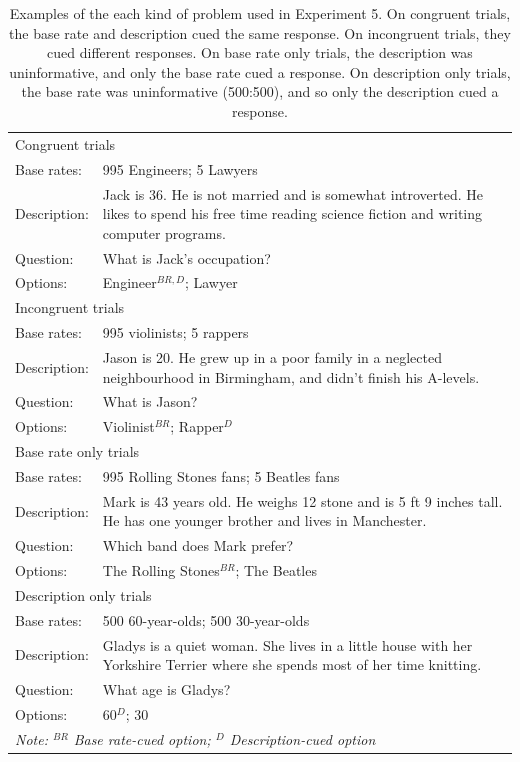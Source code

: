 \begin{table}
  \centering
  \caption[Examples problems from Experiment 5.]{
    Examples of the each kind of problem used in Experiment 5.
    On congruent trials, the base rate and description cued the same response.
    On incongruent trials, they cued different responses.
    On base rate only trials, the description was uninformative,
    and only the base rate cued a response.
    On description only trials, the base rate was uninformative (500:500),
    and so only the description cued a response.
    \label{tab:exp5_examples}
  }
  \begin{tabular}{ p{} p{}}
    \toprule
    \multicolumn{2}{l}{Congruent trials} \\
    Base rates: & 995 Engineers; 5 Lawyers \\
    Description: &  Jack is 36. He is not married and is somewhat introverted. He likes to spend his free time reading science fiction and writing computer programs. \\
    Question: & What is Jack's occupation? \\
    Options: & Engineer$^{BR,D}$; Lawyer\\

    \midrule
    \multicolumn{2}{l}{Incongruent trials} \\
    Base rates: & 995 violinists; 5 rappers \\
    Description: &  Jason is 20. He grew up in a poor family in a neglected neighbourhood in Birmingham, and didn't finish his A-levels. \\
    Question: & What is Jason? \\
    Options: & Violinist$^{BR}$; Rapper$^{D}$\\

    \midrule
    \multicolumn{2}{l}{Base rate only trials} \\
    Base rates: & 995 Rolling Stones fans; 5 Beatles fans \\
    Description: &  Mark is 43 years old. He weighs 12 stone and is 5 ft 9 inches tall. He has one younger brother and lives in Manchester. \\
    Question: & Which band does Mark prefer? \\
    Options: & The Rolling Stones$^{BR}$; The Beatles\\

    \midrule
    \multicolumn{2}{l}{Description only trials} \\
    Base rates: & 500 60-year-olds; 500 30-year-olds \\
    Description: &  Gladys is a quiet woman. She lives in a little house with her Yorkshire Terrier where she spends most of her time knitting. \\
    Question: & What age is Gladys? \\
    Options: & 60$^{D}$; 30 \\
    \bottomrule
    \multicolumn{2}{l}{
      \emph{Note: $^{BR}$ Base rate-cued option; $^{D}$ Description-cued option}
    }
  \end{tabular}
\end{table}

